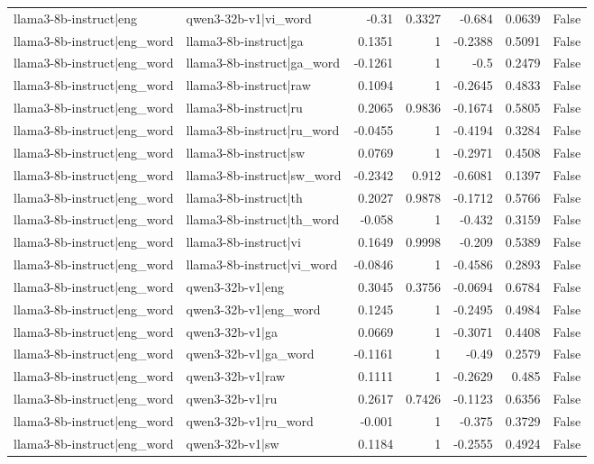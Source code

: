 \begin{table}
\begin{tabular}{l l r r r r l}
llama3-8b-instruct|eng & qwen3-32b-v1|vi_word & -0.31 & 0.3327 & -0.684 & 0.0639 & False \\
llama3-8b-instruct|eng_word & llama3-8b-instruct|ga & 0.1351 & 1 & -0.2388 & 0.5091 & False \\
llama3-8b-instruct|eng_word & llama3-8b-instruct|ga_word & -0.1261 & 1 & -0.5 & 0.2479 & False \\
llama3-8b-instruct|eng_word & llama3-8b-instruct|raw & 0.1094 & 1 & -0.2645 & 0.4833 & False \\
llama3-8b-instruct|eng_word & llama3-8b-instruct|ru & 0.2065 & 0.9836 & -0.1674 & 0.5805 & False \\
llama3-8b-instruct|eng_word & llama3-8b-instruct|ru_word & -0.0455 & 1 & -0.4194 & 0.3284 & False \\
llama3-8b-instruct|eng_word & llama3-8b-instruct|sw & 0.0769 & 1 & -0.2971 & 0.4508 & False \\
llama3-8b-instruct|eng_word & llama3-8b-instruct|sw_word & -0.2342 & 0.912 & -0.6081 & 0.1397 & False \\
llama3-8b-instruct|eng_word & llama3-8b-instruct|th & 0.2027 & 0.9878 & -0.1712 & 0.5766 & False \\
llama3-8b-instruct|eng_word & llama3-8b-instruct|th_word & -0.058 & 1 & -0.432 & 0.3159 & False \\
llama3-8b-instruct|eng_word & llama3-8b-instruct|vi & 0.1649 & 0.9998 & -0.209 & 0.5389 & False \\
llama3-8b-instruct|eng_word & llama3-8b-instruct|vi_word & -0.0846 & 1 & -0.4586 & 0.2893 & False \\
llama3-8b-instruct|eng_word & qwen3-32b-v1|eng & 0.3045 & 0.3756 & -0.0694 & 0.6784 & False \\
llama3-8b-instruct|eng_word & qwen3-32b-v1|eng_word & 0.1245 & 1 & -0.2495 & 0.4984 & False \\
llama3-8b-instruct|eng_word & qwen3-32b-v1|ga & 0.0669 & 1 & -0.3071 & 0.4408 & False \\
llama3-8b-instruct|eng_word & qwen3-32b-v1|ga_word & -0.1161 & 1 & -0.49 & 0.2579 & False \\
llama3-8b-instruct|eng_word & qwen3-32b-v1|raw & 0.1111 & 1 & -0.2629 & 0.485 & False \\
llama3-8b-instruct|eng_word & qwen3-32b-v1|ru & 0.2617 & 0.7426 & -0.1123 & 0.6356 & False \\
llama3-8b-instruct|eng_word & qwen3-32b-v1|ru_word & -0.001 & 1 & -0.375 & 0.3729 & False \\
llama3-8b-instruct|eng_word & qwen3-32b-v1|sw & 0.1184 & 1 & -0.2555 & 0.4924 & False \\

\end{tabular}
\end{table}
